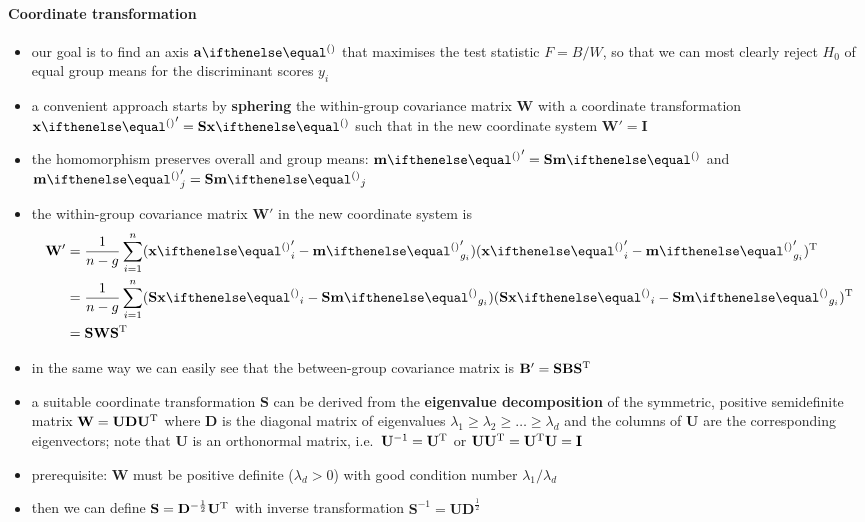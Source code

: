 \documentclass[a4paper]{article}
\begin{document}
\paragraph{Coordinate transformation}

\begin{itemize}
\item our goal is to find an axis $\va$ that maximises the test statistic $F = B / W$, so that we can most clearly reject $H_0$ of equal group means for the discriminant scores $y_i$
\item a convenient approach starts by \textbf{sphering} the within-group covariance matrix $\mathbf{W}$ with a coordinate transformation $\vx' = \mathbf{S} \vx$ such that in the new coordinate system $\mathbf{W}' = \mathbf{I}$
\item the homomorphism preserves overall and group means: $\vm' = \mathbf{S} \vm$ and $\vm'_j = \mathbf{S} \vm_j$
\item the within-group covariance matrix $\mathbf{W}'$ in the new coordinate system is
  \begin{equation}
    \label{eq:lda:Wprime}
    \begin{split}
      \mathbf{W}'
      &= \frac1{n-g} \sum_{i=1}^n (\vx'_i - \vm'_{g_i}) (\vx'_i - \vm'_{g_i})\T \\
      &= \frac1{n-g} \sum_{i=1}^n (\mathbf{S}\vx_i - \mathbf{S}\vm_{g_i}) (\mathbf{S}\vx_i - \mathbf{S}\vm_{g_i})\T \\
      &= \mathbf{S} \mathbf{W} \mathbf{S}\T
    \end{split}
  \end{equation}
\item in the same way we can easily see that the between-group covariance matrix is $\mathbf{B}' = \mathbf{S} \mathbf{B} \mathbf{S}^{\text{T}}$
\item a suitable coordinate transformation $\mathbf{S}$ can be derived from the \textbf{eigenvalue decomposition} of the symmetric, positive semidefinite matrix $\mathbf{W} = \mathbf{U} \mathbf{D} \mathbf{U}^{\text{T}}$ where $\mathbf{D}$ is the diagonal matrix of eigenvalues $\lambda_1 \geq \lambda_2 \geq \ldots \geq \lambda_d$ and the columns of $\mathbf{U}$ are the corresponding eigenvectors; note that $\mathbf{U}$ is an orthonormal matrix, i.e.\ $\mathbf{U}^{-1} = \mathbf{U}^{\text{T}}$ or $\mathbf{U} \mathbf{U}^{\text{T}} = \mathbf{U}^{\text{T}} \mathbf{U} = \mathbf{I}$
\item prerequisite: $\mathbf{W}$ must be positive definite ($\lambda_d > 0$) with good condition number $\lambda_1 / \lambda_d$
\item then we can define $\mathbf{S} = \mathbf{D}^{-\frac12} \mathbf{U}^{\text{T}}$ with inverse transformation $\mathbf{S}^{-1} = \mathbf{U} \mathbf{D}^{\frac12}$
\end{itemize}
\end{document}
